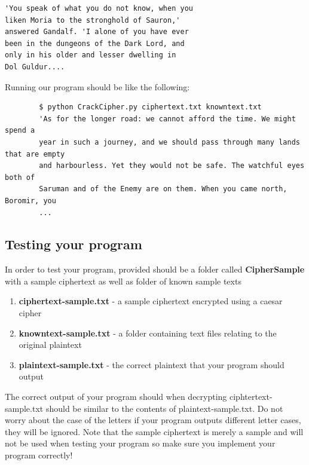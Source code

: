 \documentclass{article}
\begin{document}
\begin{file}
\begin{lstlisting}[]
'You speak of what you do not know, when you
liken Moria to the stronghold of Sauron,'
answered Gandalf. 'I alone of you have ever
been in the dungeons of the Dark Lord, and
only in his older and lesser dwelling in
Dol Guldur....
\end{lstlisting}
\end{file}

Running our program should be like the following:

\begin{commandline}
	\begin{verbatim}
		$ python CrackCipher.py ciphertext.txt knowntext.txt
		'As for the longer road: we cannot afford the time. We might spend a
		year in such a journey, and we should pass through many lands that are empty
		and harbourless. Yet they would not be safe. The watchful eyes both of
		Saruman and of the Enemy are on them. When you came north, Boromir, you
		...
	\end{verbatim}
\end{commandline}

\subsection{Testing your program}
In order to test your program, provided should be a folder called \textbf{CipherSample} with a sample ciphertext as well as folder of known sample texts
\begin{enumerate}
\item \textbf{ciphertext-sample.txt} - a sample ciphertext encrypted using a caesar cipher
\item \textbf{knowntext-sample.txt} - a folder containing text files relating to the original plaintext
\item \textbf{plaintext-sample.txt} - the correct plaintext that your program should output
\end{enumerate}

\begin{info}[Correctness:] %
The correct output of your program should when decrypting ciphtertext-sample.txt should be similar to the contents of plaintext-sample.txt. Do not worry about the case of the letters if your program outputs different letter cases, they will be ignored. Note that the sample ciphertext is merely a sample and will not be used when testing your program so make sure you implement your program correctly!
\end{info}
\end{document}
